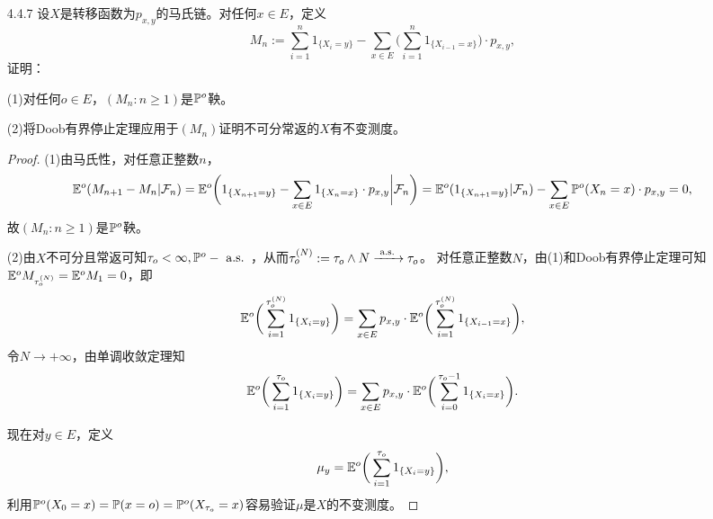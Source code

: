 \begin{enumerate}
\begin{proof}
        现在，对$1\leqslant i\leqslant k$，由(2)知存在一个$R_i$上的平稳分布$\mu^{(i)}=(\mu_j^{(i)}:j\in R_i)$，
        定义$E$上的非零测度$\mu=(\mu_y:y\in E)$为
        \[\mu_y=\begin{cases}
            \frac{1}{k}\mu_y^{(i)}&,y\in R_i\:(1\leqslant i\leqslant k);\\
            0&,y\in T.
        \end{cases}\]
        容易验证$\mu$是$E$上的平稳分布。
    \end{proof}
    \item[4.4.7] 设$X$是转移函数为$p_{x,y}$的马氏链。对任何$x\in E$，定义
    \[M_n:=\sum_{i=1}^n1_{\{X_i=y\}}-\sum_{x\in E}\bigg(\sum_{i=1}^n1_{\{X_{i-1}=x\}}\bigg)\cdot p_{x,y},\]证明：

    (1)对任何$o\in E$，$(M_n:n\geqslant1)$是$\P^o$鞅。

    (2)将Doob有界停止定理应用于$(M_n)$证明不可分常返的$X$有不变测度。
    \begin{proof}
        (1)由马氏性，对任意正整数$n$，\[\E^o(M_{n+1}-M_n|\F_n)=\E^o\bigg(1_{\{X_{n+1}=y\}}-
        \sum_{x\in E}1_{\{X_n=x\}}\cdot p_{x,y}\bigg|\F_n\bigg)=\E^o(1_{\{X_{n+1}=y\}}|\F_n)
        -\sum_{x\in E}\P^o(X_n=x)\cdot p_{x,y}=0,\]故$(M_n:n\geqslant1)$是$\P^o$鞅。

        (2)由$X$不可分且常返可知$\tau_o<\infty,\P^o-\as$，从而$\tau_o^{(N)}:=\tau_o\land N\xrightarrow{\as}\tau_o$。
        对任意正整数$N$，由(1)和Doob有界停止定理可知$\E^oM_{\tau_o^{(N)}}=\E^oM_1=0$，即
        \[\E^o\bigg(\sum_{i=1}^{\tau_o^{(N)}}1_{\{X_i=y\}}\bigg)=\sum_{x\in E}p_{x,y}\cdot\E^o\bigg(\sum_{i=1}^{\tau_o^{(N)}}1_{\{X_{i-1}=x\}}\bigg),\]
        令$N\to+\infty$，由单调收敛定理知\[\E^o\bigg(\sum_{i=1}^{\tau_o}1_{\{X_i=y\}}\bigg)=\sum_{x\in E}p_{x,y}\cdot\E^o\bigg(\sum_{i=0}^{\tau_o-1}1_{\{X_i=x\}}\bigg).\]
        
        现在对$y\in E$，定义\[\mu_y=\E^o\bigg(\sum_{i=1}^{\tau_o}1_{\{X_i=y\}}\bigg),\]
        利用$\P^o(X_0=x)=\P(x=o)=\P^o(X_{\tau_o}=x)$容易验证$\mu$是$X$的不变测度。
    \end{proof}
\end{enumerate}

